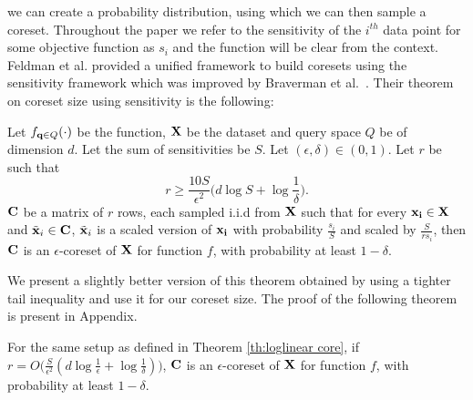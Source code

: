 we can create a probability distribution, using which we can then sample a coreset. Throughout the paper we refer to the sensitivity of the $i^{th}$ data point for some objective function as $s_i$ and the function will be clear from the context. Feldman et al. \cite{feldman2011unified} provided a unified framework to build coresets using the sensitivity framework which was improved by Braverman et al.~\cite{braverman2016new}. Their theorem on coreset size using sensitivity is the following:
\begin{theorem}\cite{braverman2016new}\label{th:loglinear core}
Let $f_{\mathbf{q} \in Q}(\cdot)$ be the function, $\mathbf{X}$ be the dataset and query space $Q$ be of dimension $d$. Let the sum of sensitivities be $S$. Let $(\epsilon,\delta) \in (0,1)$. Let $r$ be such that
\begin{equation*}
r \geq \frac{10S}{\epsilon^2}\bigg(d\log{S} + \log{\frac{1}{\delta}}\bigg).
\end{equation*}
$\mathbf{C}$ be a matrix of $r$ rows, each 
sampled i.i.d from $\mathbf{X}$ such that for every $\mathbf{x_i} \in \mathbf{X}$ and $\tilde{\mathbf{x}}_i \in \mathbf{C}$, $\tilde{\mathbf{x}}_i$ is a scaled version of $\mathbf{x_i}$ with probability $\frac{s_i}{S}$ and scaled by $\frac{S}{rs_i}$, then $\mathbf{C}$ is an $\epsilon$-coreset of $\mathbf{X}$ for function $f$, with probability at least $1- \delta$.
\end{theorem}
%
We present a slightly better version of this theorem obtained by using a tighter tail inequality and use it for our coreset size. The proof of the following theorem is present in Appendix.
\begin{theorem}\label{th: linear core}
For the same setup as defined in Theorem \ref{th:loglinear core}, if $r = O{\big(\frac{S}{\epsilon^2}(d\log{\frac{1}{\epsilon}} + \log{\frac{1}{\delta}})\big)}$,  $\mathbf{C}$ is an $\epsilon$-coreset of $\mathbf{X}$ for function $f$, with probability at least $1- \delta$.
\end{theorem}
